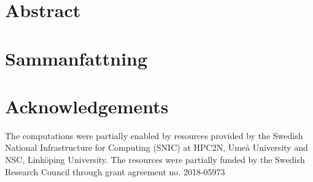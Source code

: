\chapter*{Abstract}
\lipsum[1]
\chapter*{Sammanfattning}
\lipsum[1]
\chapter*{Acknowledgements}
The computations were partially enabled by resources provided by the Swedish
National Infrastructure for Computing (SNIC) at HPC2N, Umeå University
and NSC, Linköping University. The resources were partially funded by the Swedish Research 
Council through grant agreement no. 2018-05973